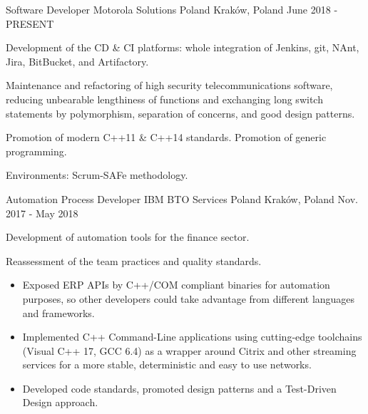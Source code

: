 
\begin{cventries}

\cventry
    {Software Developer} %
    {Motorola Solutions Poland} %
    {Kraków, Poland} %
    {June 2018 - PRESENT} %
    {
        \begin{cvitems} %
            \item {Development of the CD \& CI platforms: whole integration of Jenkins, git, NAnt, Jira, BitBucket, and Artifactory.}
            \item {Maintenance and refactoring of high security telecommunications software, reducing unbearable lengthiness of functions and exchanging long switch statements by polymorphism, separation of concerns, and good design patterns.}
            \item {Promotion of modern C++11 \& C++14 standards. Promotion of generic programming.}
            \item {Environments: Scrum-SAFe methodology.}
        \end{cvitems}
    }

\cventry
    {Automation Process Developer} %
    {IBM BTO Services Poland} %
    {Kraków, Poland} %
    {Nov. 2017 - May 2018} %
    {
        \begin{cvitems} %
            \item {Development of automation tools for the finance sector.}
            \item {Reassessment of the team practices and quality standards.}
            \begin{itemize}
                \item {Exposed ERP APIs by C++/COM compliant binaries for automation purposes, so other developers could take advantage from different languages and frameworks.}
                \item {Implemented C++ Command-Line applications using cutting-edge toolchains (Visual C++ 17, GCC 6.4) as a wrapper around Citrix and other streaming services for a more stable, deterministic and easy to use networks.}
                \item {Developed code standards, promoted design patterns and a Test-Driven Design approach.}
            \end{itemize}
        \end{cvitems}
    }


\end{cventries}
